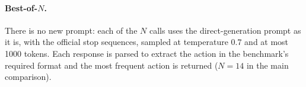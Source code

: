 \paragraph{Best-of-$N$.}
There is no new prompt: each of the $N$ calls uses the direct-generation prompt as it is, with the
official stop sequences, sampled at temperature $0.7$ and at most 1000 tokens. Each response is parsed to extract the action in the benchmark's required format
and the most frequent action is returned ($N=14$ in the main comparison).